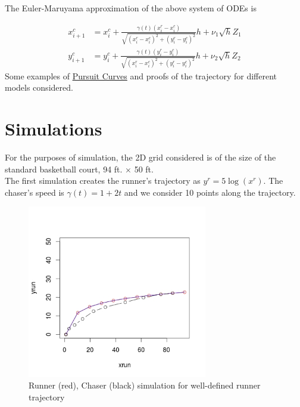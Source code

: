 \documentclass[a4paper,11pt]{article}
\begin{document}
The Euler-Maruyama approximation of the above system of ODEs is

\begin{align*}
x^{c}_{i+1} & = x^{c}_{i} + \frac{\gamma(t) (x^{r}_{i} - x^{c}_{i})}{\sqrt{(x^{r}_{i} - x^{c}_{i})^2 + (y^{r}_{i} - y^{c}_{i})^2}} h + \nu_1 \sqrt{h} Z_1 \\
y^{c}_{i+1} & = y^{c}_{i} + \frac{\gamma(t) (y^{r}_{i} - y^{c}_{i})}{\sqrt{(x^{r}_{i} - x^{c}_{i})^2 + (y^{r}_{i} - y^{c}_{i})^2}}h + \nu_2 \sqrt{h} Z_2
\end{align*}
Some examples of  \href{http://home2.fvcc.edu/~dhicketh/DiffEqns/Spring11projects/Jonah_Franchi_Katy_Steiner/Diff%20EQ%20Project.pdf}{Pursuit Curves} and proofs of the trajectory for different models considered.

\section{Simulations}
For the purposes of simulation, the 2D grid considered is of the size of the standard basketball court, 94 ft. $\times$ 50 ft.  \\

The first simulation creates the runner's trajectory as $y^{r} = 5\log(x^{r})$. The chaser's speed is $\gamma(t) = 1+2t$ and we consider 10 points along the trajectory.

\begin{figure}[H]
\centering
\includegraphics[width=0.7\textwidth]{simulation.jpeg}
\caption{Runner (red), Chaser (black) simulation for well-defined runner trajectory}
\end{figure}
\end{document}
